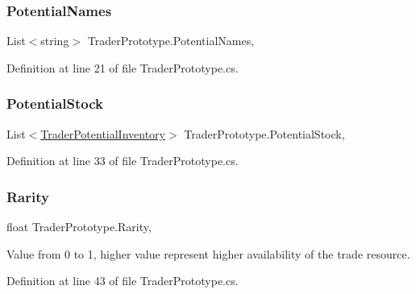 \subsubsection{\texorpdfstring{Potential\+Names}{PotentialNames}}
{\footnotesize\ttfamily List$<$string$>$ Trader\+Prototype.\+Potential\+Names\hspace{0.3cm}{\ttfamily [get]}, {\ttfamily [set]}}



Definition at line 21 of file Trader\+Prototype.\+cs.

\mbox{\label{class_trader_prototype_a7c5d5d814feb2f88ec9734d04520f353}} 
\subsubsection{\texorpdfstring{Potential\+Stock}{PotentialStock}}
{\footnotesize\ttfamily List$<$\hyperlink{class_trader_potential_inventory}{Trader\+Potential\+Inventory}$>$ Trader\+Prototype.\+Potential\+Stock\hspace{0.3cm}{\ttfamily [get]}, {\ttfamily [set]}}



Definition at line 33 of file Trader\+Prototype.\+cs.

\mbox{\label{class_trader_prototype_a4207b86e570e7237b9df76b91cd0e7e1}} 
\subsubsection{\texorpdfstring{Rarity}{Rarity}}
{\footnotesize\ttfamily float Trader\+Prototype.\+Rarity\hspace{0.3cm}{\ttfamily [get]}, {\ttfamily [set]}}



Value from 0 to 1, higher value represent higher availability of the trade resource. 



Definition at line 43 of file Trader\+Prototype.\+cs.

\mbox{\label{class_trader_prototype_a16f54dc71faed15a0466dc7ebc413926}} 
